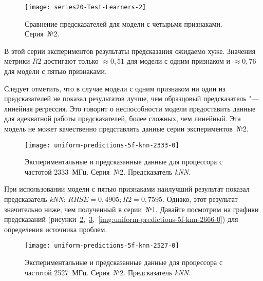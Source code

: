 \begin{figure}[H]
    \begin{center}
            \texttt{[image: series20-Test-Learners-2]}
            \caption{Сравнение предсказателей для модели с четырьмя признаками. Серия~№2.}
            \label{img:series20-Test-Learners-2}
    \end{center}
\end{figure}

В этой серии экспериментов результаты предсказания ожидаемо хуже. Значения метрики $R2$ достигают только $\approx 0,51$ для модели с одним признаком и $\approx 0,76$ для модели с пятью признаками.

Следует отметить, что в случае модели с одним признаком ни один из предсказателей не показал результатов лучше, чем образцовый предсказатель "--- линейная регрессия. Это говорит о неспособности модели предоставить данные для адекватной работы предсказателей, более сложных, чем линейный. Эта модель не может качественно представлять данные серии экспериментов~№2.

\begin{figure}[H]
    \begin{center}
        \texttt{[image: uniform-predictions-5f-knn-2333-0]}
        \caption{Экспериментальные и предсказанные данные для процессора с частотой 2333~МГц. Серия~№2. Предсказатель \textit{kNN}.}
        \label{img:uniform-predictions-5f-knn-2333-0}
    \end{center}
\end{figure}

При использовании модели с пятью признаками наилучший результат показал предсказатель \textit{kNN}: $RRSE = 0,4905; R2 = 0,7595$. Однако, этот результат значительно ниже, чем полученный в серии~№1. Давайте посмотрим на графики предсказаний (рисунки~\ref{img:uniform-predictions-5f-knn-2333-0},~\ref{img:uniform-predictions-5f-knn-2527-0},~\ref{img:uniform-predictions-5f-knn-2666-0}) для определения источника проблем.

\begin{figure}[H]
    \begin{center}
        \texttt{[image: uniform-predictions-5f-knn-2527-0]}
        \caption{Экспериментальные и предсказанные данные для процессора с частотой 2527~МГц. Серия~№2. Предсказатель \textit{kNN}.}
        \label{img:uniform-predictions-5f-knn-2527-0}
    \end{center}
\end{figure}

